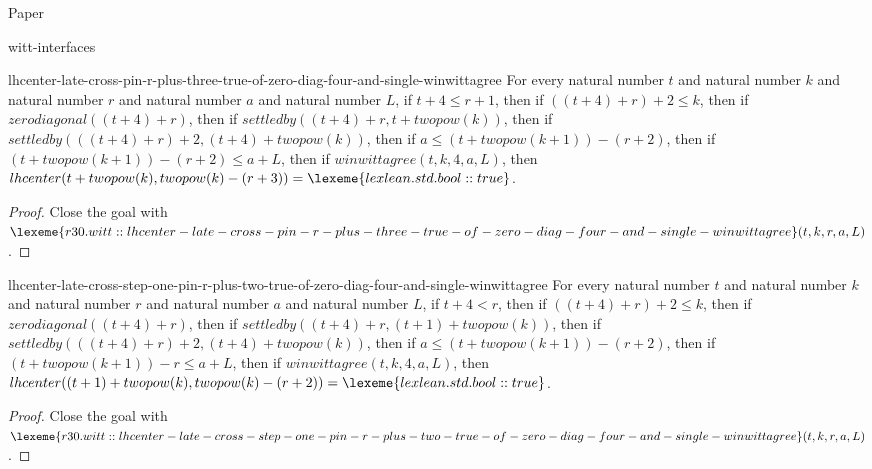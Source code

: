 \begin{lexlean}{Paper}
\begin{section}{witt-interfaces}
  \begin{theorem}{lhcenter-late-cross-pin-r-plus-three-true-of-zero-diag-four-and-single-winwittagree}
  For every natural number \(t\) and natural number \(k\) and natural number \(r\) and natural number \(a\) and natural number \(L\), if \(t + 4 ≤ r + 1\), then if \(((t + 4) + r) + 2 ≤ k\), then if \(zerodiagonal((t + 4) + r)\), then if \(settledby((t + 4) + r, t + twopow(k))\), then if \(settledby(((t + 4) + r) + 2, (t + 4) + twopow(k))\), then if \(a ≤ (t + twopow(k + 1)) - (r + 2)\), then if \((t + twopow(k + 1)) - (r + 2) ≤ a + L\), then if \(winwittagree(t, k, 4, a, L)\), then \(lhcenter(t + twopow(k), twopow(k) - (r + 3)) = \lexeme{lexlean.std.bool::true}\).
  \begin{proof}
  Close the goal with \(\lexeme{r30.witt::lhcenter-late-cross-pin-r-plus-three-true-of-zero-diag-four-and-single-winwittagree}(t, k, r, a, L)\).
  \end{proof}
  \end{theorem}

  \begin{theorem}{lhcenter-late-cross-step-one-pin-r-plus-two-true-of-zero-diag-four-and-single-winwittagree}
  For every natural number \(t\) and natural number \(k\) and natural number \(r\) and natural number \(a\) and natural number \(L\), if \(t + 4 < r\), then if \(((t + 4) + r) + 2 ≤ k\), then if \(zerodiagonal((t + 4) + r)\), then if \(settledby((t + 4) + r, (t + 1) + twopow(k))\), then if \(settledby(((t + 4) + r) + 2, (t + 4) + twopow(k))\), then if \(a ≤ (t + twopow(k + 1)) - (r + 2)\), then if \((t + twopow(k + 1)) - r ≤ a + L\), then if \(winwittagree(t, k, 4, a, L)\), then \(lhcenter((t + 1) + twopow(k), twopow(k) - (r + 2)) = \lexeme{lexlean.std.bool::true}\).
  \begin{proof}
  Close the goal with \(\lexeme{r30.witt::lhcenter-late-cross-step-one-pin-r-plus-two-true-of-zero-diag-four-and-single-winwittagree}(t, k, r, a, L)\).
  \end{proof}
  \end{theorem}


\end{section}
\end{lexlean}
